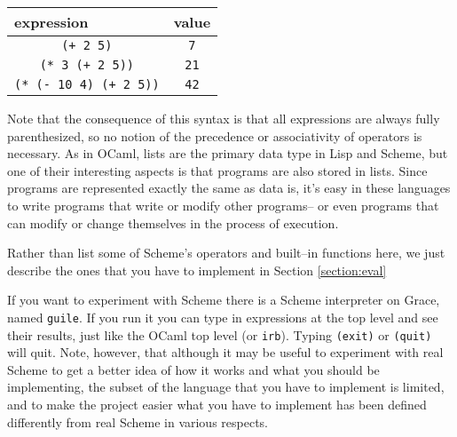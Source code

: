 \documentclass[11pt]{article}
\begin{document}
    \vspace{-2mm}

    \begin{center}

      \begin{tabular}[t]{|c|c|}

        \multicolumn{1}{l}{expression}
          & \multicolumn{1}{c}{value}
          \\ \hline

        \texttt{(+ 2 5)}
          & \texttt{7}
          \\ \hline

        \texttt{(* 3 (+ 2 5))}
          & \texttt{21}
          \\ \hline

        \texttt{(* (- 10 4) (+ 2 5))}
          & \texttt{42}
          \\ \hline

      \end{tabular}

    \end{center}

  Note that the consequence of this syntax is that all expressions are
  always fully parenthesized, so no notion of the precedence or
  associativity of operators is necessary.  As in OCaml, lists are the
  primary data type in Lisp and Scheme, but one of their interesting aspects
  is that programs are also stored in lists.  Since programs are
  represented exactly the same as data is,  it's easy in these languages
  to write programs that write or modify other programs-- or even programs
  that can modify or change themselves in the process of execution.

    Rather than list some of Scheme's operators and built--in functions here,
  we just describe the ones that you have to implement in Section
  \ref{section:eval}

    If you want to experiment with Scheme there is a Scheme interpreter on
  Grace, named \texttt{guile}.  If you run it you can type in expressions at
  the top level and see their results, just like the OCaml top level (or
  \texttt{irb}).  Typing \texttt{(exit)} or \texttt{(quit)} will quit.
  Note, however, that although it may be useful to experiment with real
  Scheme to get a better idea of how it works and what you should be
  implementing, the subset of the language that you have to implement is
  limited, and to make the project easier what you have to implement has
  been defined differently from real Scheme in various respects.
\end{document}
